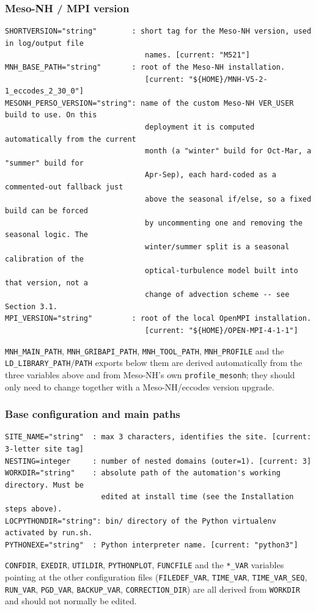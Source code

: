 \subsubsection{Meso-NH / MPI version}
\begin{lstlisting}
SHORTVERSION="string"        : short tag for the Meso-NH version, used in log/output file
                                names. [current: "M521"]
MNH_BASE_PATH="string"       : root of the Meso-NH installation.
                                [current: "${HOME}/MNH-V5-2-1_eccodes_2_30_0"]
MESONH_PERSO_VERSION="string": name of the custom Meso-NH VER_USER build to use. On this
                                deployment it is computed automatically from the current
                                month (a "winter" build for Oct-Mar, a "summer" build for
                                Apr-Sep), each hard-coded as a commented-out fallback just
                                above the seasonal if/else, so a fixed build can be forced
                                by uncommenting one and removing the seasonal logic. The
                                winter/summer split is a seasonal calibration of the
                                optical-turbulence model built into that version, not a
                                change of advection scheme -- see Section 3.1.
MPI_VERSION="string"         : root of the local OpenMPI installation.
                                [current: "${HOME}/OPEN-MPI-4-1-1"]
\end{lstlisting}
\texttt{MNH\_MAIN\_PATH}, \texttt{MNH\_GRIBAPI\_PATH}, \texttt{MNH\_TOOL\_PATH}, \texttt{MNH\_PROFILE}
and the \texttt{LD\_LIBRARY\_PATH}\slash\texttt{PATH} exports below them are derived automatically from
the three variables above and from Meso-NH's own \texttt{profile\_mesonh}; they should only need to
change together with a Meso-NH/eccodes version upgrade.

\subsubsection{Base configuration and main paths}
\begin{lstlisting}
SITE_NAME="string"  : max 3 characters, identifies the site. [current: 3-letter site tag]
NESTING=integer     : number of nested domains (outer=1). [current: 3]
WORKDIR="string"    : absolute path of the automation's working directory. Must be
                      edited at install time (see the Installation steps above).
LOCPYTHONDIR="string": bin/ directory of the Python virtualenv activated by run.sh.
PYTHONEXE="string"  : Python interpreter name. [current: "python3"]
\end{lstlisting}
\texttt{CONFDIR}, \texttt{EXEDIR}, \texttt{UTILDIR}, \texttt{PYTHONPLOT}, \texttt{FUNCFILE} and the
\texttt{*\_VAR} variables pointing at the other configuration files (\texttt{FILEDEF\_VAR},
\texttt{TIME\_VAR}, \texttt{TIME\_VAR\_SEQ}, \texttt{RUN\_VAR}, \texttt{PGD\_VAR},
\texttt{BACKUP\_VAR}, \texttt{CORRECTION\_DIR}) are all derived from \texttt{WORKDIR} and should not
normally be edited.

